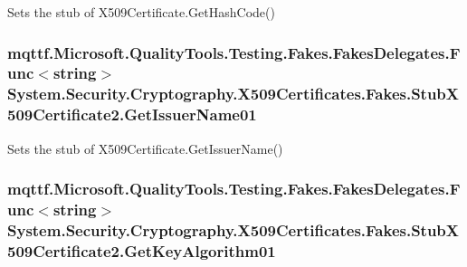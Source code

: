 Sets the stub of X509\-Certificate.\-Get\-Hash\-Code()

\hypertarget{class_system_1_1_security_1_1_cryptography_1_1_x509_certificates_1_1_fakes_1_1_stub_x509_certificate2_ae55ad680393b306028833c8c771b1bad}{
\subsubsection[{Get\-Issuer\-Name01}]{\setlength{\rightskip}{0pt plus 5cm}mqttf.\-Microsoft.\-Quality\-Tools.\-Testing.\-Fakes.\-Fakes\-Delegates.\-Func$<$string$>$ System.\-Security.\-Cryptography.\-X509\-Certificates.\-Fakes.\-Stub\-X509\-Certificate2.\-Get\-Issuer\-Name01}}\label{class_system_1_1_security_1_1_cryptography_1_1_x509_certificates_1_1_fakes_1_1_stub_x509_certificate2_ae55ad680393b306028833c8c771b1bad}


Sets the stub of X509\-Certificate.\-Get\-Issuer\-Name()

\hypertarget{class_system_1_1_security_1_1_cryptography_1_1_x509_certificates_1_1_fakes_1_1_stub_x509_certificate2_a26d4de12b688a948a367a61087426407}{
\subsubsection[{Get\-Key\-Algorithm01}]{\setlength{\rightskip}{0pt plus 5cm}mqttf.\-Microsoft.\-Quality\-Tools.\-Testing.\-Fakes.\-Fakes\-Delegates.\-Func$<$string$>$ System.\-Security.\-Cryptography.\-X509\-Certificates.\-Fakes.\-Stub\-X509\-Certificate2.\-Get\-Key\-Algorithm01}}\label{class_system_1_1_security_1_1_cryptography_1_1_x509_certificates_1_1_fakes_1_1_stub_x509_certificate2_a26d4de12b688a948a367a61087426407}


